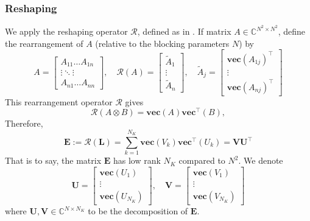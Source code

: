 \documentclass[10pt]{article}  %
\theoremstyle{plain}
\numberwithin{equation}{section}
\def\mR{\mathcal{R}}
\def\C{\mathbb{C}}
\newcommand{\bL}{\mathbf{L}}
\newcommand{\bV}{\mathbf{V}}
\newcommand{\bU}{\mathbf{U}}
\newcommand{\bE}{\mathbf{E}}
\renewcommand{\vec}{\textbf{vec}}
\renewcommand{\C}{\mathbb{C}}
\begin{document}
\subsubsection{Reshaping}
We apply the reshaping operator $\mR$, defined as in \cite{vanloanApproximationKroneckerProducts1993}. If matrix $A \in \C^{N^2\times N^2}$, define the rearrangement of $A$ (relative to the blocking parameters $N$) by
\begin{equation}
	A = 
	\begin{bmatrix}
 	A_{11} \dots A_{1n}\\
 	\vdots \ddots \vdots\\
 	A_{n1} \dots A_{nn} 
 	\end{bmatrix}, 
 	\quad
	\mR(A) = 
	\begin{bmatrix}
		\widetilde A_1\\ \vdots \\ \widetilde A_{n}	
	\end{bmatrix}
	,\quad 
	\widetilde A_j = 
	\begin{bmatrix}
		\vec(A_{1j})^\top \\ 
		\vdots \\
		\vec(A_{nj})^\top	
	\end{bmatrix}
\end{equation}
This rearrangement operator $\mR$ gives 
\begin{equation}
	\mR(A\otimes B) = \vec(A) \vec^\top(B),
\end{equation}
Therefore, 
\begin{equation}
	\bE := \mR(\bL) = \sum_{k = 1}^{N_K} \vec(V_k) \vec^\top(U_k) = \bV \bU^\top
\end{equation}
That is to say, the matrix $\bE$ has low rank $N_K$ compared to $N^2$. We denote 
\begin{equation}
	\bU = 
	\begin{bmatrix}
		\vec(U_1)\\ \vdots \\ \vec(U_{N_K})
	\end{bmatrix}, \quad
	\bV = 
	\begin{bmatrix}
		\vec(V_1)\\ \vdots \\ \vec(V_{N_K})
	\end{bmatrix}
\end{equation}
where $\bU, \bV \in \C^{N \times N_K}$ to be the decomposition of $\bE$. 
\end{document}
